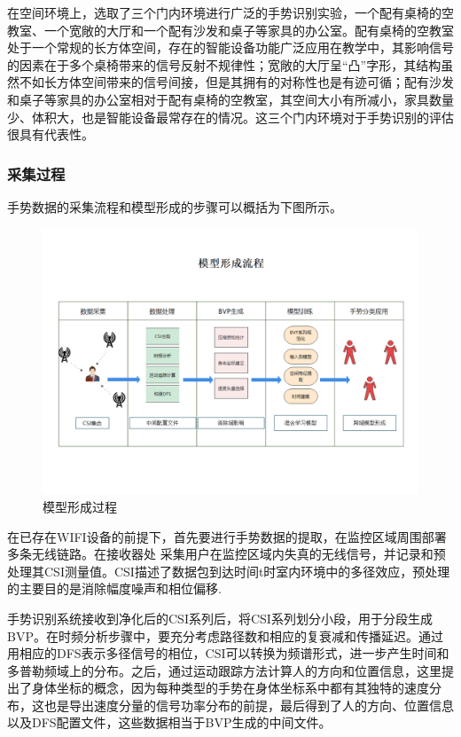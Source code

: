 \documentclass[a4paper]{article}
\begin{document}
  在空间环境上，选取了三个门内环境进行广泛的手势识别实验，一个配有桌椅的空教室、一个宽敞的大厅和一个配有沙发和桌子等家具的办公室。配有桌椅的空教室处于一个常规的长方体空间，存在的智能设备功能广泛应用在教学中，其影响信号的因素在于多个桌椅带来的信号反射不规律性；宽敞的大厅呈“凸”字形，其结构虽然不如长方体空间带来的信号间接，但是其拥有的对称性也是有迹可循；配有沙发和桌子等家具的办公室相对于配有桌椅的空教室，其空间大小有所减小，家具数量少、体积大，也是智能设备最常存在的情况。这三个门内环境对于手势识别的评估很具有代表性。
  \subsubsection{采集过程}
  手势数据的采集流程和模型形成的步骤可以概括为下图所示。 \par
    \begin{figure}[H]
                \centering
                \includegraphics[width=16cm]{images/process.png}
                \caption{模型形成过程}
                \label{fig1}
              \end{figure}
  在已存在WIFI设备的前提下，首先要进行手势数据的提取，在监控区域周围部署多条无线链路。在接收器处
采集用户在监控区域内失真的无线信号，并记录和预处理其CSI测量值。CSI描述了数据包到达时间t时室内环境中的多径效应，预处理的主要目的是消除幅度噪声和相位偏移. \par
  手势识别系统接收到净化后的CSI系列后，将CSI系列划分小段，用于分段生成BVP。在时频分析步骤中，要充分考虑路径数和相应的复衰减和传播延迟。通过用相应的DFS表示多径信号的相位，CSI可以转换为频谱形式，进一步产生时间和多普勒频域上的分布。之后，通过运动跟踪方法计算人的方向和位置信息，这里提出了身体坐标的概念，因为每种类型的手势在身体坐标系中都有其独特的速度分布，这也是导出速度分量的信号功率分布的前提，最后得到了人的方向、位置信息以及DFS配置文件，这些数据相当于BVP生成的中间文件。 \par
\end{document}
